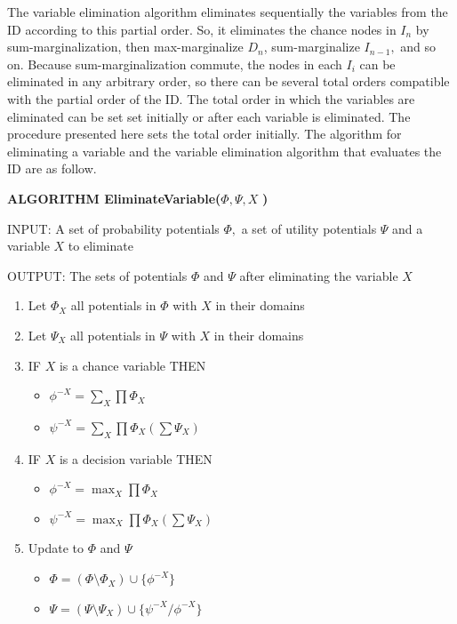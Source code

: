 The variable elimination algorithm eliminates sequentially the variables
from the ID according to this partial order. So, it eliminates the chance
nodes in $I_{n}$ by sum-marginalization, then max-marginalize $D_{n}$,
sum-marginalize $I_{n-1},$ and so on. Because sum-marginalization commute,
the nodes in each $I_{i}$ can be eliminated in any arbitrary order, so there
can be several total orders compatible with the partial order of the ID. The
total order in which the variables are eliminated can be set set initially
or after each variable is eliminated. The procedure presented here sets the
total order initially. The algorithm for eliminating a variable and the
variable elimination algorithm that evaluates the ID are as follow.

\noindent \textsf{\textbf{ALGORITHM EliminateVariable(}}$\Phi ,\Psi ,X$%
\textsf{\textbf{)}}

\bigskip \noindent INPUT: A set of probability potentials $\Phi ,$ a set of
utility potentials $\Psi $ and a variable $X$ to eliminate

\noindent OUTPUT: The sets of potentials $\Phi $ and $\Psi $ after
eliminating the variable $X$

\begin{enumerate}
\item Let $\Phi _{X}$ all potentials in $\Phi $ with $X$ in their domains

\item Let $\Psi _{X}$ all potentials in $\Psi $ with $X$ in their domains

\item IF $X$ is a chance variable THEN

\begin{itemize}
\item $\phi ^{-X}=\sum_{X}\prod \Phi _{X}$

\item $\psi ^{-X}=\sum_{X}\prod \Phi _{X}\left( \sum \Psi _{X}\right) $
\end{itemize}

\item IF $X$ is a decision variable THEN

\begin{itemize}
\item $\phi ^{-X}=\max_{X}\prod \Phi _{X}$

\item $\psi ^{-X}=\max_{X}\prod \Phi _{X}\left( \sum \Psi _{X}\right) $
\end{itemize}

\item Update to $\Phi $ and $\Psi $

\begin{itemize}
\item $\Phi =\left( \Phi \setminus \Phi _{X}\right) \cup \{\phi ^{-X}\}$

\item $\Psi =\left( \Psi \setminus \Psi _{X}\right) \cup \{\psi ^{-X}/\phi
^{-X}\}$
\end{itemize}
\end{enumerate}

